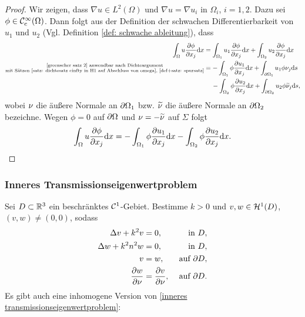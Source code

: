\begin{proof}
	Wir zeigen, dass \(\nabla u\in L^2(\Omega)\) und \(\nabla u=\nabla u_i\) in \(\Omega_i\), \(i=1,2\). Dazu sei \(\phi\in\mathcal{C}_{\mathrm{c}}^\infty(\Omega)\). Dann folgt aus der Definition der schwachen Differentierbarkeit von \(u_1\) und \(u_2\) (Vgl. Definition \ref{def: schwache ableitung}), dass
	\begin{align*}
		\int_\Omega u\frac{\partial\phi}{\partial x_j}\mathrm{d}x
		&=\int_{\Omega_1}u_1\frac{\partial\phi}{\partial x_j}\mathrm{d}x + \int_{\Omega_2}u_2\frac{\partial\phi}{\partial x_j}\mathrm{d}x\\
		\substack{
		\text{\scriptsize\eqref{greenscher satz 2} anwendbar nach Dichteargument}\\
		\text{mit Sätzen \ref{satz: dichtesatz cinfty in H1 auf Abschluss von omega}, \ref{def+satz: spursatz}}
		}
		&=-\int_{\Omega_1}\phi\frac{\partial u_1}{\partial x_j}\mathrm{d}x + \int_{\partial\Omega_1}u_1\phi\nu_j\mathrm{d}s\\
		&\quad\, - \int_{\Omega_2}\phi\frac{\partial u_2}{\partial x_j}\mathrm{d}x + \int_{\partial\Omega_2}u_2\phi\widetilde{\nu}_j\mathrm{d}s,
	\end{align*}
	wobei \(\nu\) die äußere Normale an \(\partial\Omega_1\) bzw. \(\widetilde{\nu}\) die äußere Normale an \(\partial\Omega_2\) bezeichne. Wegen \(\phi=0\) auf \(\partial\Omega\) und \(\nu=-\widetilde{\nu}\) auf \(\Sigma\) folgt
	\begin{equation*}
		\int_{\Omega}u\frac{\partial\phi}{\partial x_j}\mathrm{d}x = -\int_{\Omega_1}\phi\frac{\partial u_1}{\partial x_j}\mathrm{d}x - \int_{\Omega_2}\phi\frac{\partial u_2}{\partial x_j}\mathrm{d}x.
	\end{equation*}
\end{proof}

\subsubsection*{Inneres Transmissionseigenwertproblem}
Sei \(D\subset\mathbb{R}^3\) ein beschränktes \(\mathcal{C}^1\)-Gebiet. Bestimme \(k>0\) und \(v,w\in\mathcal{H}^1(D)\), \((v,w)\neq(0,0)\), sodass
\begin{equation}
	\label{inneres transmissionseigenwertproblem}
	\begin{aligned}
		\Delta v+k^2v&=0,&\text{ in }D,\\
		\Delta w+k^2n^2w&=0,&\text{ in }D,\\
		v&=w,&\text{ auf }\partial D,\\
		\frac{\partial w}{\partial\nu}&=\frac{\partial v}{\partial\nu},&\text{ auf }\partial D.
	\end{aligned}
\end{equation}
Es gibt auch eine inhomogene Version von \eqref{inneres transmissionseigenwertproblem}:
